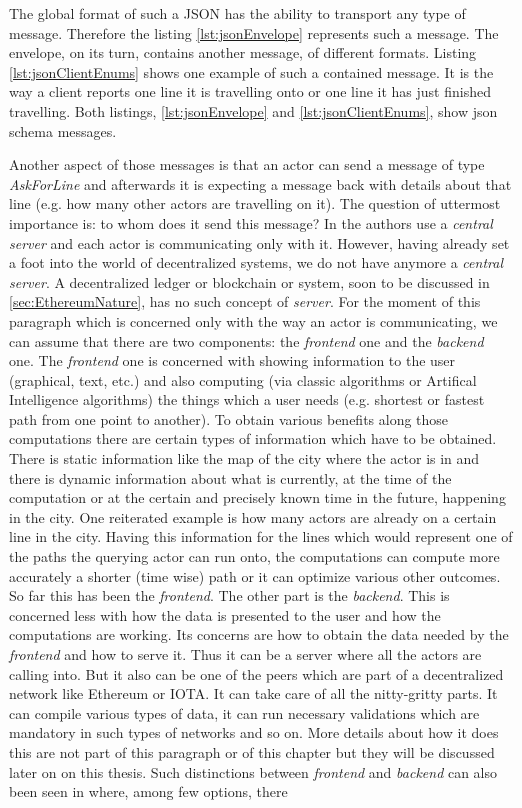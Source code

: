 \documentclass[a4paper,12pt,twoside]{book}
\begin{document}
    The global format of such a JSON has the ability to transport any type of message. Therefore the listing \ref{lst:jsonEnvelope} represents such a message. The envelope, on its turn, contains another message, of different formats. Listing \ref{lst:jsonClientEnums} shows one example of such a contained message. It is the way a client reports one line it is travelling onto or one line it has just finished travelling. Both listings, \ref{lst:jsonEnvelope} and \ref{lst:jsonClientEnums}, show json schema messages. 
    
    Another aspect of those messages is that an actor can send a message of type \textit{AskForLine} and afterwards it is expecting a message back with details about that line (e.g. how many other actors are travelling on it). The question of uttermost importance is: to whom does it send this message? In \cite{MicroservicesCityTrafficSimulation} the authors use a \textit{central server} and each actor is communicating only with it. However, having already set a foot into the world of decentralized systems, we do not have anymore a \textit{central server}. A decentralized ledger or blockchain or system, soon to be discussed in \ref{sec:EthereumNature}, has no such concept of \textit{server}. For the moment of this paragraph which is concerned only with the way an actor is communicating, we can assume that there are two components: the \textit{frontend} one and the \textit{backend} one. The \textit{frontend} one is concerned with showing information to the user (graphical, text, etc.) and also computing (via classic algorithms or Artifical Intelligence algorithms) the things which a user needs (e.g. shortest or fastest path from one point to another). To obtain various benefits along those computations there are certain types of information which have to be obtained. There is static information like the map of the city where the actor is in and there is dynamic information about what is currently, at the time of the computation or at the certain and precisely known time in the future, happening in the city. One reiterated example is how many actors are already on a certain line in the city. Having this information for the lines which would represent one of the paths the querying actor can run onto, the computations can compute more accurately a shorter (time wise) path or it can optimize various other outcomes. So far this has been the \textit{frontend}. The other part is the \textit{backend}. This is concerned less with how the data is presented to the user and how the computations are working. Its concerns are how to obtain the data needed by the \textit{frontend} and how to serve it. Thus it can be a server where all the actors are calling into. But it also can be one of the peers which are part of a decentralized network like Ethereum or IOTA. It can take care of all the nitty-gritty parts. It can compile various types of data, it can run necessary validations which are mandatory in such types of networks and so on. More details about how it does this are not part of this paragraph or of this chapter but they will be discussed later on on this thesis. Such distinctions between \textit{frontend} and \textit{backend} can also been seen in \cite{ApproachesToFrontEnd} where, among few options, there 
\end{document}
